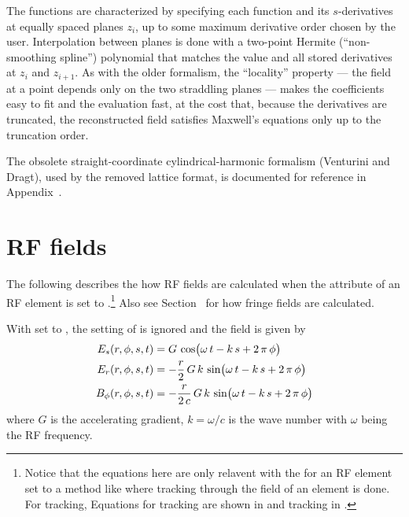 The functions are characterized by specifying each function and its $s$-derivatives at equally spaced
planes $z_i$, up to some maximum derivative order chosen by the user. Interpolation between planes is
done with a two-point Hermite (``non-smoothing spline'') polynomial that matches the value and all
stored derivatives at $z_i$ and $z_{i+1}$. As with the older formalism, the ``locality'' property ---
the field at a point depends only on the two straddling planes --- makes the coefficients easy to fit
and the evaluation fast, at the cost that, because the derivatives are truncated, the reconstructed
field satisfies Maxwell's equations only up to the truncation order.

The obsolete straight-coordinate cylindrical-harmonic formalism (Venturini and Dragt\cite{b:gen.grad}),
used by the removed  lattice format, is documented for reference in
Appendix~.

\section{RF fields}
\label{s:rf.fields}

The following describes the how RF fields are calculated when the 
attribute of an RF element is set to .\footnote
  {
Notice that the equations here are only relavent with the  for an RF element set
to a method like  where tracking through the field of an element is done.  For
 tracking, Equations for  tracking are shown in 
and  tracking in .
  }
Also see Section~ for how fringe fields are calculated.

With  set to , the setting of  is ignored
and the field is given by
\begin{align}
  E_s(r, \phi, s, t) &= G \, \cos\bigl( \omega \, t - k \, s + 2 \, \pi \, \phi \bigr) \nonumber \\
  E_r(r, \phi, s, t) &= -\frac{r}{2} \, G \, k \, \sin\bigl( \omega \, t - k \, s + 2 \, \pi \, \phi \bigr) \\
  B_\phi(r, \phi, s, t) &= -\frac{r}{2 \, c} \, G \, k \, \sin\bigl( \omega \, t - k \, s + 2 \, \pi \, \phi \bigr) \nonumber
  \label{egot}
\end{align}
where $G$ is the accelerating gradient, $k = \omega / c$ is the wave number with $\omega$ being the
RF frequency.

